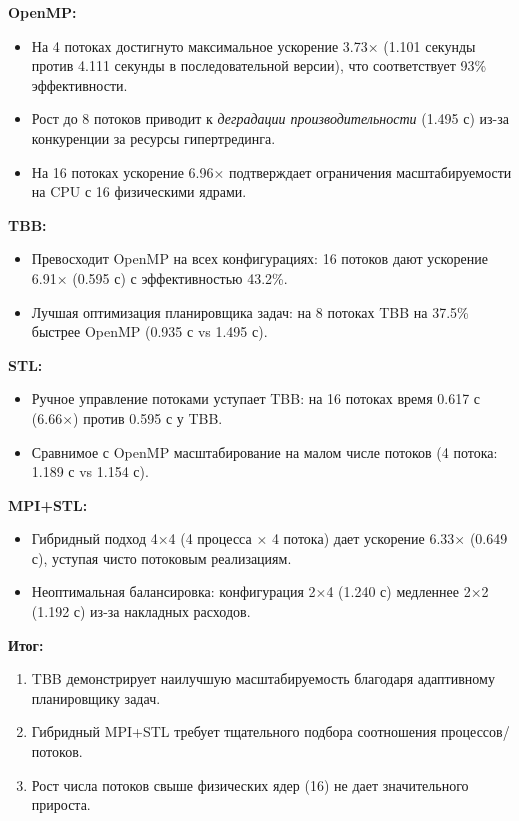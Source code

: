 \documentclass[a4paper,12pt]{article}
\begin{document}
\textbf{OpenMP:} 
\begin{itemize}
\item На 4 потоках достигнуто максимальное ускорение 3.73× (1.101 секунды против 4.111 секунды в последовательной версии), что соответствует 93\% эффективности.
\item Рост до 8 потоков приводит к \textit{деградации производительности} (1.495 с) из-за конкуренции за ресурсы гипертрединга.
\item На 16 потоках ускорение 6.96× подтверждает ограничения масштабируемости на CPU с 16 физическими ядрами.
\end{itemize}

\textbf{TBB:} 
\begin{itemize}
\item Превосходит OpenMP на всех конфигурациях: 16 потоков дают ускорение 6.91× (0.595 с) с эффективностью 43.2\%.
\item Лучшая оптимизация планировщика задач: на 8 потоках TBB на 37.5\% быстрее OpenMP (0.935 с vs 1.495 с).
\end{itemize}

\textbf{STL:} 
\begin{itemize}
\item Ручное управление потоками уступает TBB: на 16 потоках время 0.617 с (6.66×) против 0.595 с у TBB.
\item Сравнимое с OpenMP масштабирование на малом числе потоков (4 потока: 1.189 с vs 1.154 с).
\end{itemize}

\textbf{MPI+STL:} 
\begin{itemize}
\item Гибридный подход 4×4 (4 процесса × 4 потока) дает ускорение 6.33× (0.649 с), уступая чисто потоковым реализациям.
\item Неоптимальная балансировка: конфигурация 2×4 (1.240 с) медленнее 2×2 (1.192 с) из-за накладных расходов.
\end{itemize}

\textbf{Итог:}
\begin{enumerate}
\item TBB демонстрирует наилучшую масштабируемость благодаря адаптивному планировщику задач.
\item Гибридный MPI+STL требует тщательного подбора соотношения процессов/потоков.
\item Рост числа потоков свыше физических ядер (16) не дает значительного прироста.
\end{enumerate}
\end{document}
